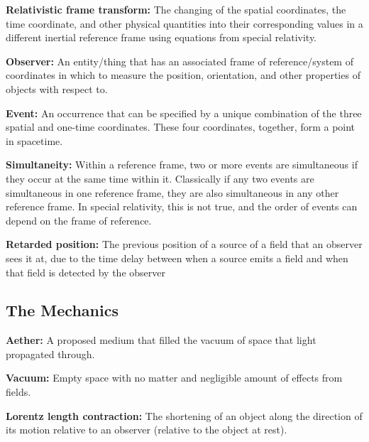 \noindent \hypertarget{def-lorentz-transform}{\textbf{Relativistic frame transform:}}
The changing of the spatial coordinates, the time coordinate, and other physical quantities into their corresponding values in a different inertial reference frame using equations from special relativity.

\noindent \hypertarget{def-observer}{\textbf{Observer:}}
An entity/thing that has an associated frame of reference/system of coordinates in which to measure the position, orientation, and other properties of objects with respect to.

\noindent \hypertarget{def-event}{\textbf{Event:}}
An occurrence that can be specified by a unique combination of the three spatial and one-time coordinates. These four coordinates, together, form a point in spacetime.

\noindent \hypertarget{def-simultaneity}{\textbf{Simultaneity:}}
Within a reference frame, two or more events are simultaneous if they occur at the same time within it. Classically if any two events are simultaneous in one reference frame, they are also simultaneous in any other reference frame. In special relativity, this is not true, and the order of events can depend on the frame of reference.

\noindent \hypertarget{def-retarded-position}{\textbf{Retarded position:}}
The previous position of a source of a field that an observer sees it at, due to the time delay between when a source emits a field and when that field is detected by the observer


\subsection{The Mechanics}%

\noindent \hypertarget{def-aether}{\textbf{Aether:}}
A proposed medium that filled the vacuum of space that light propagated through.

\noindent \hypertarget{def-vacuum}{\textbf{Vacuum:}}
Empty space with no matter and negligible amount of effects from fields.

\noindent \hypertarget{def-length-contraction}{\textbf{Lorentz length contraction:}}
The shortening of an object along the direction of its motion relative to an observer (relative to the object at rest).

